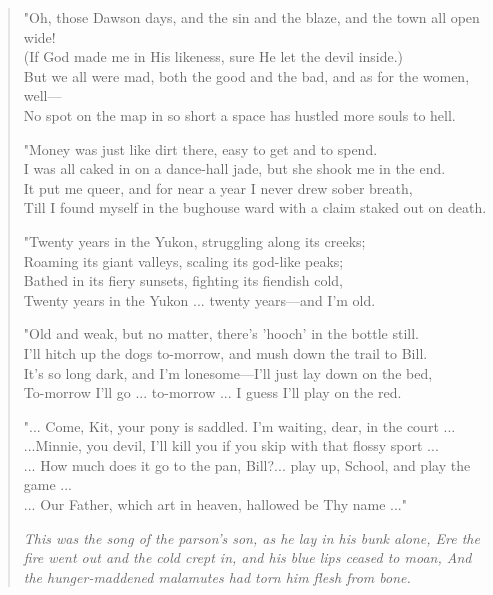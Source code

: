 \begin{verse}
"Oh, those Dawson days, and the sin and the blaze, and the town all open wide!\\
(If God made me in His likeness, sure He let the devil inside.)\\
But we all were mad, both the good and the bad, and as for the women, well—\\
No spot on the map in so short a space has hustled more souls to hell.

"Money was just like dirt there, easy to get and to spend.\\
I was all caked in on a dance-hall jade, but she shook me in the end.\\
It put me queer, and for near a year I never drew sober breath,\\
Till I found myself in the bughouse ward with a claim staked out on death.

"Twenty years in the Yukon, struggling along its creeks;\\
Roaming its giant valleys, scaling its god-like peaks;\\
Bathed in its fiery sunsets, fighting its fiendish cold,\\
Twenty years in the Yukon ... twenty years—and I'm old.

"Old and weak, but no matter, there's 'hooch' in the bottle still.\\
I'll hitch up the dogs to-morrow, and mush down the trail to Bill.\\
It's so long dark, and I'm lonesome—I'll just lay down on the bed,\\
To-morrow I'll go ... to-morrow ... I guess I'll play on the red.

"... Come, Kit, your pony is saddled. I'm waiting, dear, in the court ...\\
...Minnie, you devil, I'll kill you if you skip with that flossy sport ...\\
... How much does it go to the pan, Bill?... play up, School, and play the game ...\\
... Our Father, which art in heaven, hallowed be Thy name ..."

\textit{
This was the song of the parson's son, as he lay in his bunk alone,
Ere the fire went out and the cold crept in, and his blue lips ceased to moan,
And the hunger-maddened malamutes had torn him flesh from bone.
}

\end{verse}
